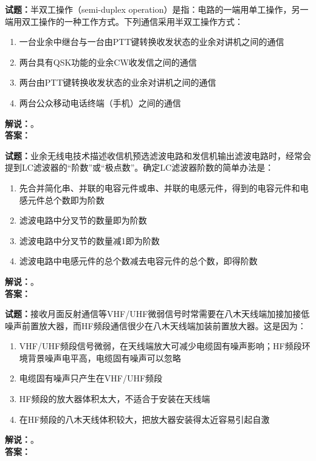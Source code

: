 \documentclass{ctexbook}
\begin{document}
\bigskip




\noindent\textbf{试题：}半双工操作（semi-duplex operation）是指：电路的一端用单工操作，另一端用双工操作的一种工作方式。下列通信采用半双工操作方式：
\begin{enumerate}[leftmargin=3em]
\item 一台业余中继台与一台由PTT键转换收发状态的业余对讲机之间的通信
\item 两台具有QSK功能的业余CW收发信之间的通信
\item 两台由PTT键转换收发状态的业余对讲机之间的通信
\item 两台公众移动电话终端（手机）之间的通信
\end{enumerate}
\noindent\textbf{解说：}\textbf{}。\\\noindent\textbf{答案：}

\bigskip




\noindent\textbf{试题：}业余无线电技术描述收信机预选滤波电路和发信机输出滤波电路时，经常会提到LC滤波器的“阶数”或“极点数”。确定LC滤波器阶数的简单办法是：
\begin{enumerate}[leftmargin=3em]
\item 先合并简化串、并联的电容元件或串、并联的电感元件，得到的电容元件和电感元件总个数即为阶数
\item 滤波电路中分叉节的数量即为阶数
\item 滤波电路中分叉节的数量减1即为阶数
\item 滤波电路中电感元件的总个数减去电容元件的总个数，即得阶数
\end{enumerate}
\noindent\textbf{解说：}\textbf{}。\\\noindent\textbf{答案：}

\bigskip




\noindent\textbf{试题：}接收月面反射通信等VHF/UHF微弱信号时常需要在八木天线端加接加接低噪声前置放大器，而HF频段通信很少在八木天线端加装前置放大器。这是因为：
\begin{enumerate}[leftmargin=3em]
\item VHF/UHF频段信号微弱，在天线端放大可减少电缆固有噪声影响；HF频段环境背景噪声电平高，电缆固有噪声可以忽略
\item 电缆固有噪声只产生在VHF/UHF频段
\item HF频段的放大器体积太大，不适合于安装在天线端
\item 在HF频段的八木天线体积较大，把放大器安装得太近容易引起自激
\end{enumerate}
\noindent\textbf{解说：}\textbf{}。\\\noindent\textbf{答案：}
\end{document}
